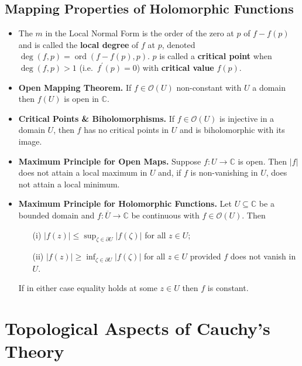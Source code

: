 \documentclass{article}
\DeclareMathOperator{\order}{ord}
\DeclareMathOperator{\degree}{deg}
\newenvironment{topic}[1]{%
{\subsection{#1}}%
\begin{itemize}%
}{%
\end{itemize}%
}
\newcommand{\theorem}[1]{\item {\bf #1.}}
\newcommand{\corollary}[1]{\item {\bf #1.}}
\newcommand{\term}[1]{{\bf #1}}
\newcommand{\holo}[1]{\mathcal{O}(#1)}
\newcommand{\remark}{\item}
\begin{document}
\begin{topic}{Mapping Properties of Holomorphic Functions}
\remark The $m$ in the Local Normal Form is the order of the zero at $p$ of $f - f(p)$ and is called the \term{local degree} of $f$ at $p$, denoted $\degree(f, p) = \order(f - f(p), p)$. $p$ is called a \term{critical point} when $\degree(f, p) > 1$ (i.e.\ $f^\prime(p) = 0$) with \term{critical value} $f(p)$.

\theorem{Open Mapping Theorem} If $f \in \holo{U}$ non-constant with $U$ a domain then $f(U)$ is open in $\mathbb{C}$.

\corollary{Critical Points \& Biholomorphisms} If $f \in \holo{U}$ is injective in a domain $U$, then $f$ has no critical points in $U$ and is biholomorphic with its image.

\theorem{Maximum Principle for Open Maps} Suppose $f : U \to \mathbb{C}$ is open. Then $|f|$ does not attain a local maximum in $U$ and, if $f$ is non-vanishing in $U$, does not attain a local minimum.

\theorem{Maximum Principle for Holomorphic Functions} Let $U \subseteq \mathbb{C}$ be a bounded domain and $f : \overline{U} \to \mathbb{C}$ be continuous with $f \in \holo{U}$. Then
\begin{enumerate}
\item[(i)] $|f(z)| \leq \sup_{\zeta \in \partial U} |f(\zeta)|$ for all $z \in U$;
\item[(ii)] $|f(z)| \geq \inf_{\zeta \in \partial U} |f(\zeta)|$ for all $z \in U$ provided $f$ does not vanish in $U$.
\end{enumerate}
If in either case equality holds at some $z \in U$ then $f$ is constant.

\end{topic}


\newpage
\section{Topological Aspects of Cauchy's Theory}
\end{document}
